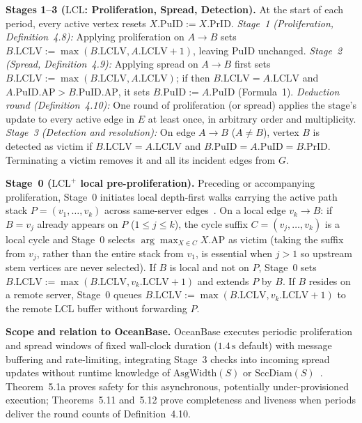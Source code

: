 \documentclass[sigconf,nonacm]{acmart}
\newcommand{\lclv}{\mathrm{LCLV}}
\newcommand{\puid}{\mathrm{PuID}}
\newcommand{\prid}{\mathrm{PrID}}
\newcommand{\ap}{\mathrm{AP}}
\newcommand{\asgwidth}{\mathrm{AsgWidth}}
\newcommand{\sccdiam}{\mathrm{SccDiam}}
\begin{document}
\textbf{Stages 1--3 (\(\text{LCL}\): Proliferation, Spread, Detection).}
At the start of each period, every active vertex resets
\(X.\puid:=X.\prid\).
\emph{Stage~1 (Proliferation, Definition~4.8):} Applying proliferation
on \(A\to B\) sets \(B.\lclv:=\max(B.\lclv,A.\lclv+1)\), leaving
\(\puid\) unchanged.
\emph{Stage~2 (Spread, Definition~4.9):} Applying spread on \(A\to B\)
first sets \(B.\lclv:=\max(B.\lclv,A.\lclv)\); if then
\(B.\lclv=A.\lclv\) and \(A.\puid.\ap>B.\puid.\ap\), it sets
\(B.\puid:=A.\puid\) (Formula~1).
\emph{Deduction round (Definition~4.10):} One round of proliferation (or
spread) applies the stage's update to every active edge in \(E\) at
least once, in arbitrary order and multiplicity.
\emph{Stage~3 (Detection and resolution):} On edge \(A\to B\)
(\(A\neq B\)), vertex \(B\) is detected as victim if
\(B.\lclv=A.\lclv\) and \(B.\puid=A.\puid=B.\prid\). Terminating a
victim removes it and all its incident edges from \(G\).

\textbf{Stage~0 (\(\text{LCL}^+\) local pre-proliferation).}
Preceding or accompanying proliferation, Stage~0 initiates local
depth-first walks carrying the active path stack \(P=(v_1,\dots,v_k)\)
across same-server edges~\cite[\S4.7, Algorithm~2]{lclplus}. On a local
edge \(v_k\to B\): if \(B=v_j\) already appears on \(P\)
(\(1\le j\le k\)), the cycle suffix \(C=(v_j,\dots,v_k)\) is a local
cycle and Stage~0 selects \(\arg\max_{X\in C} X.\ap\) as victim (taking
the suffix from \(v_j\), rather than the entire stack from \(v_1\), is
essential when \(j>1\) so upstream stem vertices are never selected). If
\(B\) is local and not on \(P\), Stage~0 sets
\(B.\lclv:=\max(B.\lclv,v_k.\lclv+1)\) and extends \(P\) by \(B\). If
\(B\) resides on a remote server, Stage~0 queues
\(B.\lclv:=\max(B.\lclv,v_k.\lclv+1)\) to the remote LCL buffer without
forwarding \(P\).

\textbf{Scope and relation to OceanBase.}
OceanBase executes periodic proliferation and spread windows of fixed
wall-clock duration (\(1.4\,\text{s}\) default) with message buffering
and rate-limiting, integrating Stage~3 checks into incoming spread
updates without runtime knowledge of \(\asgwidth(S)\) or
\(\sccdiam(S)\)~\cite[\S4.6, \S7.1]{lclplus}. Theorem~5.1a proves safety
for this asynchronous, potentially under-provisioned execution;
Theorems~5.11 and~5.12 prove completeness and liveness when periods
deliver the round counts of Definition~4.10.
\par
\endgroup
\end{document}
